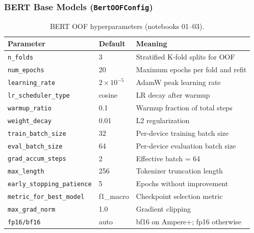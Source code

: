 \documentclass[11pt,a4paper]{article}
\begin{document}
\subsubsection{BERT Base Models (\texttt{BertOOFConfig})}
\begin{table}[htbp]
  \centering
  \caption{BERT OOF hyperparameters (notebooks 01--03).}
  \label{tab:bert-hparams}
  \small
  \begin{tabular}{@{}lll@{}}
    \toprule
    Parameter & Default & Meaning \\
    \midrule
    \texttt{n\_folds} & 3 & Stratified K-fold splits for OOF \\
    \texttt{num\_epochs} & 20 & Maximum epochs per fold and refit \\
    \texttt{learning\_rate} & $2 \times 10^{-5}$ & AdamW peak learning rate \\
    \texttt{lr\_scheduler\_type} & cosine & LR decay after warmup \\
    \texttt{warmup\_ratio} & 0.1 & Warmup fraction of total steps \\
    \texttt{weight\_decay} & 0.01 & L2 regularization \\
    \texttt{train\_batch\_size} & 32 & Per-device training batch size \\
    \texttt{eval\_batch\_size} & 64 & Per-device evaluation batch size \\
    \texttt{grad\_accum\_steps} & 2 & Effective batch = 64 \\
    \texttt{max\_length} & 256 & Tokenizer truncation length \\
    \texttt{early\_stopping\_patience} & 5 & Epochs without improvement \\
    \texttt{metric\_for\_best\_model} & f1\_macro & Checkpoint selection metric \\
    \texttt{max\_grad\_norm} & 1.0 & Gradient clipping \\
    \texttt{fp16/bf16} & auto & bf16 on Ampere+; fp16 otherwise \\
    \bottomrule
  \end{tabular}
\end{table}
\end{document}
